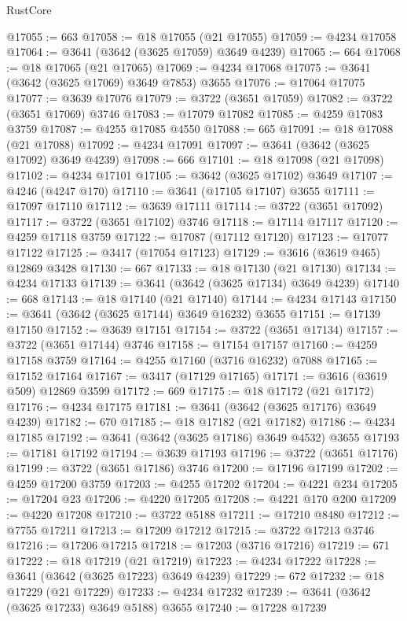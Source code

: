 \begin{lexlean}{RustCore}
\begin{coremodule}
@17055 := 663
@17058 := @18 @17055 (@21 @17055)
@17059 := @4234 @17058
@17064 := @3641 (@3642 (@3625 @17059) @3649 @4239)
@17065 := 664
@17068 := @18 @17065 (@21 @17065)
@17069 := @4234 @17068
@17075 := @3641 (@3642 (@3625 @17069) @3649 @7853) @3655
@17076 := @17064 @17075
@17077 := @3639 @17076
@17079 := @3722 (@3651 @17059)
@17082 := @3722 (@3651 @17069) @3746
@17083 := @17079 @17082
@17085 := @4259 @17083 @3759
@17087 := @4255 @17085 @4550
@17088 := 665
@17091 := @18 @17088 (@21 @17088)
@17092 := @4234 @17091
@17097 := @3641 (@3642 (@3625 @17092) @3649 @4239)
@17098 := 666
@17101 := @18 @17098 (@21 @17098)
@17102 := @4234 @17101
@17105 := @3642 (@3625 @17102) @3649
@17107 := @4246 (@4247 @170)
@17110 := @3641 (@17105 @17107) @3655
@17111 := @17097 @17110
@17112 := @3639 @17111
@17114 := @3722 (@3651 @17092)
@17117 := @3722 (@3651 @17102) @3746
@17118 := @17114 @17117
@17120 := @4259 @17118 @3759
@17122 := @17087 (@17112 @17120)
@17123 := @17077 @17122
@17125 := @3417 (@17054 @17123)
@17129 := @3616 (@3619 @465) @12869 @3428
@17130 := 667
@17133 := @18 @17130 (@21 @17130)
@17134 := @4234 @17133
@17139 := @3641 (@3642 (@3625 @17134) @3649 @4239)
@17140 := 668
@17143 := @18 @17140 (@21 @17140)
@17144 := @4234 @17143
@17150 := @3641 (@3642 (@3625 @17144) @3649 @16232) @3655
@17151 := @17139 @17150
@17152 := @3639 @17151
@17154 := @3722 (@3651 @17134)
@17157 := @3722 (@3651 @17144) @3746
@17158 := @17154 @17157
@17160 := @4259 @17158 @3759
@17164 := @4255 @17160 (@3716 @16232) @7088
@17165 := @17152 @17164
@17167 := @3417 (@17129 @17165)
@17171 := @3616 (@3619 @509) @12869 @3599
@17172 := 669
@17175 := @18 @17172 (@21 @17172)
@17176 := @4234 @17175
@17181 := @3641 (@3642 (@3625 @17176) @3649 @4239)
@17182 := 670
@17185 := @18 @17182 (@21 @17182)
@17186 := @4234 @17185
@17192 := @3641 (@3642 (@3625 @17186) @3649 @4532) @3655
@17193 := @17181 @17192
@17194 := @3639 @17193
@17196 := @3722 (@3651 @17176)
@17199 := @3722 (@3651 @17186) @3746
@17200 := @17196 @17199
@17202 := @4259 @17200 @3759
@17203 := @4255 @17202
@17204 := @4221 @234
@17205 := @17204 @23
@17206 := @4220 @17205
@17208 := @4221 @170 @200
@17209 := @4220 @17208
@17210 := @3722 @5188
@17211 := @17210 @8480
@17212 := @7755 @17211
@17213 := @17209 @17212
@17215 := @3722 @17213 @3746
@17216 := @17206 @17215
@17218 := @17203 (@3716 @17216)
@17219 := 671
@17222 := @18 @17219 (@21 @17219)
@17223 := @4234 @17222
@17228 := @3641 (@3642 (@3625 @17223) @3649 @4239)
@17229 := 672
@17232 := @18 @17229 (@21 @17229)
@17233 := @4234 @17232
@17239 := @3641 (@3642 (@3625 @17233) @3649 @5188) @3655
@17240 := @17228 @17239

\end{coremodule}
\end{lexlean}
